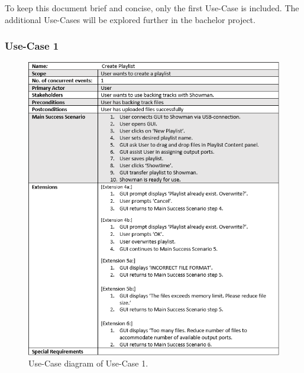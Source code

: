 To keep this document brief and concise, only the first Use-Case is included. The additional Use-Cases will be explored further in the bachelor project.


\subsubsection{Use-Case 1}

\begin{figure}[H]
\centering
\includegraphics[scale=1]{./pictures/UC1.png}
\caption{Use-Case diagram of Use-Case 1.}
\label{fig:UC1.png}
\end{figure}





